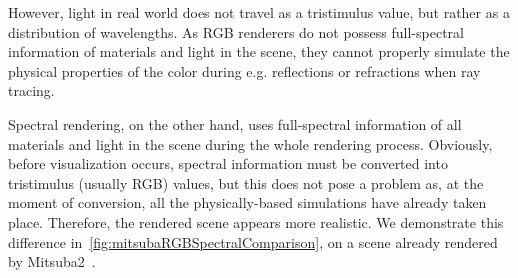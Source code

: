 However, light in real world does not travel as a tristimulus value, but rather as a distribution of wavelengths. As RGB renderers do not possess full-spectral information of materials and light in the scene, they cannot properly simulate the physical properties of the color during e.g. reflections or refractions when ray tracing.

Spectral rendering, on the other hand, uses full-spectral information of all materials and light in the scene during the whole rendering process. Obviously, before visualization occurs, spectral information must be converted into tristimulus (usually RGB) values, but this does not pose a problem as, at the moment of conversion, all the physically-based simulations have already taken place. Therefore, the rendered scene appears more realistic. We demonstrate this difference in~\cref{fig:mitsubaRGBSpectralComparison}, on a scene already rendered by Mitsuba2~\cite{Mitsuba2}.

